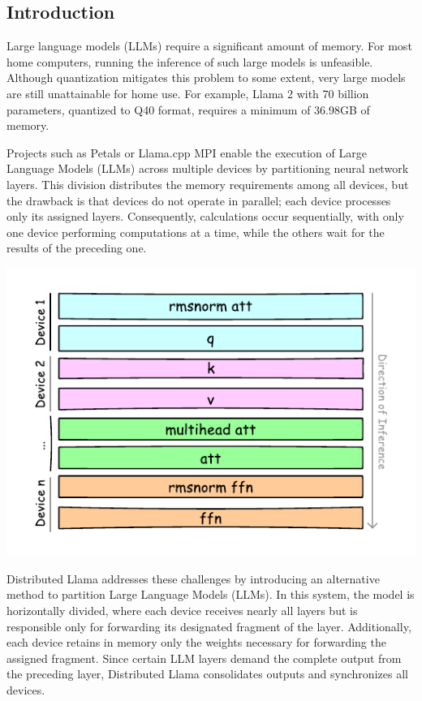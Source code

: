 \documentclass{article}
\newenvironment{Figure}
  {\par\medskip\noindent\minipage{\linewidth}}
  {\endminipage\par\medskip}
\begin{document}
\begin{multicols}{2}

\section{Introduction}

Large language models (LLMs) require a significant amount of memory. For most home computers, running the inference of such large models is unfeasible. Although quantization mitigates this problem to some extent, very large models are still unattainable for home use. For example, Llama 2 \cite{llama2}  with 70 billion parameters, quantized to Q40 format, requires a minimum of 36.98GB of memory.

Projects such as Petals \cite{borzunov2022petals} or Llama.cpp MPI \cite{llamacpp} enable the execution of Large Language Models (LLMs) across multiple devices by partitioning neural network layers. This division distributes the memory requirements among all devices, but the drawback is that devices do not operate in parallel; each device processes only its assigned layers. Consequently, calculations occur sequentially, with only one device performing computations at a time, while the others wait for the results of the preceding one.

\begin{Figure}
  \centering
  \includegraphics[width=\linewidth]{fig1.pdf}
\end{Figure}

Distributed Llama addresses these challenges by introducing an alternative method to partition Large Language Models (LLMs). In this system, the model is horizontally divided, where each device receives nearly all layers but is responsible only for forwarding its designated fragment of the layer. Additionally, each device retains in memory only the weights necessary for forwarding the assigned fragment. Since certain LLM layers demand the complete output from the preceding layer, Distributed Llama consolidates outputs and synchronizes all devices.


\end{multicols}
\end{document}
